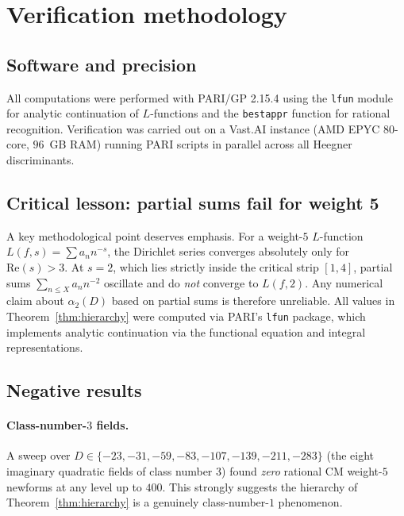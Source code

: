 \documentclass[12pt]{amsart}
\theoremstyle{definition}
\begin{document}
\section{Verification methodology}
\label{sec:verify}

\subsection{Software and precision}

All computations were performed with PARI/GP 2.15.4 \cite{PARI215}
using the \texttt{lfun} module for analytic continuation of $L$-functions
and the \texttt{bestappr} function for rational recognition.
Verification was carried out on a Vast.AI instance (AMD EPYC 80-core, $96$~GB
RAM) running PARI scripts in parallel across all Heegner discriminants.

\subsection{Critical lesson: partial sums fail for weight 5}

A key methodological point deserves emphasis.
For a weight-$5$ $L$-function $L(f,s) = \sum a_n n^{-s}$, the Dirichlet series
converges absolutely only for $\mathrm{Re}(s) > 3$.
At $s = 2$, which lies strictly inside the critical strip $[1,4]$, partial
sums $\sum_{n \leq X} a_n n^{-2}$ oscillate and do \emph{not} converge to
$L(f,2)$.
Any numerical claim about $\alpha_2(D)$ based on partial sums is therefore
unreliable.
All values in Theorem~\ref{thm:hierarchy} were computed via PARI's
\texttt{lfun} package, which implements analytic continuation via the
functional equation and integral representations.

\subsection{Negative results}

\paragraph{Class-number-$3$ fields.}
A sweep over $D \in \{-23, -31, -59, -83, -107, -139, -211, -283\}$
(the eight imaginary quadratic fields of class number $3$)
found \emph{zero} rational CM weight-$5$ newforms at any level up to $400$.
This strongly suggests the hierarchy of Theorem~\ref{thm:hierarchy} is a
genuinely class-number-$1$ phenomenon.
\end{document}
